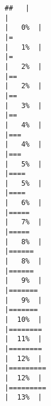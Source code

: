 \documentclass[
]{book}
\begin{document}
\begin{verbatim}
##   |                                                                              |                                                                      |   0%  |                                                                              |=                                                                     |   1%  |                                                                              |=                                                                     |   2%  |                                                                              |==                                                                    |   2%  |                                                                              |==                                                                    |   3%  |                                                                              |==                                                                    |   4%  |                                                                              |===                                                                   |   4%  |                                                                              |===                                                                   |   5%  |                                                                              |====                                                                  |   5%  |                                                                              |====                                                                  |   6%  |                                                                              |=====                                                                 |   7%  |                                                                              |=====                                                                 |   8%  |                                                                              |======                                                                |   8%  |                                                                              |======                                                                |   9%  |                                                                              |=======                                                               |   9%  |                                                                              |=======                                                               |  10%  |                                                                              |========                                                              |  11%  |                                                                              |========                                                              |  12%  |                                                                              |=========                                                             |  12%  |                                                                              |=========                                                             |  13%  |                                                                              
\end{verbatim}
\end{document}
